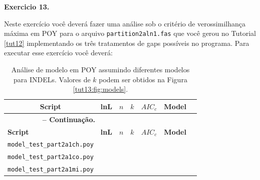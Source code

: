 \begin{refsection}
\begin{table}[H]
\begin{center}
\begin{tabular}{llllllll}
\end{tabular}
\end{center}
\end{table}



\normalsize
{}
\begin{blackBlock}{\textbf{Exercicio 13.}}\label{tut13:ex:13.4}

Neste exercício você deverá fazer uma análise sob o critério de verossimilhança máxima em POY para o arquivo \texttt{partition2aln1.fas} que você gerou no Tutorial \ref{tut12} implementando os três tratamentos de gaps possíveis no programa. Para executar esse exercício você deverá:

\end{blackBlock}



\pagestyle{fancy}
\begin{center}

\begin{longtable}{|l|>{\centering}m{2cm}|>{\centering}m{1cm}|c|>{\centering}m{2cm}|>{\centering}m{2cm} |@{}m{0pt}@{}}
\caption[Tratamento de gaps em POY.]{Análise de modelo em POY assumindo diferentes modelos para INDELs. Valores de $k$ podem ser obtidos na Figura \ref{tut13:fig:models}.} \label{tut13:ex:13.4} \\

\hline\hline  \multicolumn{1}{|c|}{\textbf{Script}} & \textbf{lnL}  & \textbf{$n$} & \textbf{$k$} & \textbf{$AIC_{c}$} & \textbf{Model} &\\
\endfirsthead

\multicolumn{3}{c}{{\bfseries \tablename\ \thetable{} -- Continuação.}}\\
\hline\hline \textbf{Script} & \textbf{lnL}  & \textbf{$n$} & \textbf{$k$} & \textbf{$AIC_{c}$} & \textbf{Model} &\\
\endhead
\hline \hline
\endlastfoot
\hline \scriptsize\texttt{model\_test\_part2a1ch.poy} & & & & & &\\
\hline \scriptsize\texttt{model\_test\_part2a1co.poy} & & & & & &\\
\hline \scriptsize\texttt{model\_test\_part2a1mi.poy} & & & & & &\\
\end{longtable}
\end{center}


\end{refsection}
